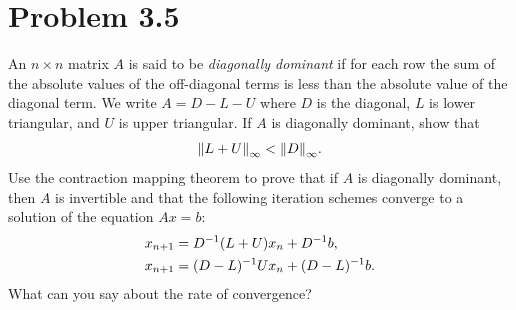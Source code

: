 \newpage
\section{Problem 3.5}
An $n \times n$ matrix $A$ is said to be \textit{diagonally dominant} if for each row the sum of the absolute values of the off-diagonal terms is less than the absolute value of the diagonal term. We write $A = D - L - U$ where $D$ is the diagonal, $L$ is lower triangular, and $U$ is upper triangular. If $A$ is diagonally dominant, show that 
\[\norm{L + U}_\infty < \norm{D}_\infty.\]
Use the contraction mapping theorem to prove that if $A$ is diagonally dominant, then $A$ is invertible and that the following iteration schemes converge to a solution of the equation $Ax = b$:
\begin{align}
    &x_{n+1} = D^{-1} (L + U)x_n + D^{-1} b,\\
    &x_{n+1} = (D - L)^{-1} Ux_n + (D - L)^{-1} b.
\end{align}
What can you say about the rate of convergence?
\partbreak
